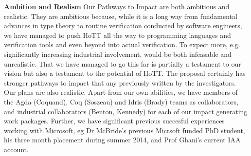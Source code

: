 \documentclass[a4paper,11pt]{article}
\begin{document}
{\bf Ambition and Realism} Our Pathways to Impact
are both ambitious and realistic. They are ambitious because, while it
is a long way from fundamental advances in type theory to routine
verification conducted by software engineers, we have managed to push
HoTT all the way to programming languages and verification tools and
even beyond into actual verification. To expect more,
e.g. significantly increasing industrial involvement, would be both
infeasable and unrealistic. That we have managed to go this far is
partially a testament to our vision but also a testament to the
potential of HoTT. The proposal certainly has stronger pathways to
impact that any previously written by the investigators. Our plans are
also realistic. Apart from our own abilities, we have members of the
Agda (Coquand), Coq (Soszeau) and Idris (Brady) teams as
collaborators, and industrial collaborators (Benton, Kennedy) for each
of our impact generating work packages. Further, we have significant
previous succesful experiences working with Microsoft, eg Dr McBride's
previous Micrsoft funded PhD student, his three month placement during
summer 2014, and Prof Ghani's current IAA account.




\end{document}
